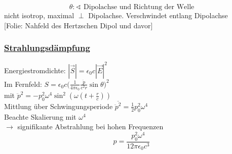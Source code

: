 \documentclass[titlepage,12pt,a4paper,ngerman]{report}
\newcommand{\tx}[1]{\textrm{#1}}
\newcommand{\folie}[1]{\color{gray}[Folie: #1]\color{black}}
\begin{document}

$$\theta: \sphericalangle \tx{ Dipolachse und Richtung der Welle}$$
nicht isotrop, maximal $ \perp $ Dipolachse. Verschwindet entlang Dipolachse\\
\folie{Nahfeld des Hertzschen Dipol und davor}
\subsubsection{\underline{Strahlungsdämpfung}}
Energiestromdichte: $ |\vec{S}| = \epsilon_0 c |\vec{E}|^2 $\\
Im Fernfeld: $ S = \epsilon_0 c \bigg( \frac{1}{4 \pi \epsilon_0} \frac{\ddot{p}}{c^2r} \sin \theta \bigg)^2 $\\
mit $ \ddot{p}^2 = - p_0^2 \omega^4 \sin^2 (\omega(t+\frac{r}{c})) $\\
Mittlung über Schwingungsperiode $ \overline{\ddot{p}^2} = \frac{1}{2} p_0^2 \omega^4 $\\
Beachte Skalierung mit $ \omega^4 $\\
$ \rightarrow $ signifikante Abstrahlung bei hohen Frequenzen
$$\boxed{p = \frac{p_0^2 \omega^4}{12 \pi \epsilon_0 c^3}}$$
\end{document}
